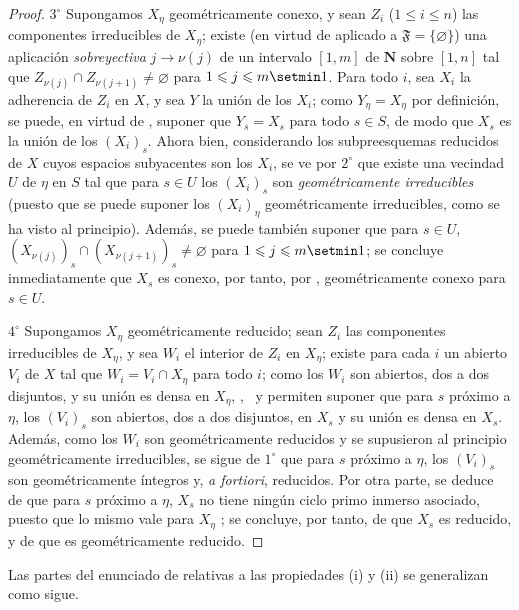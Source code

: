 \begin{proof}
$3^\circ$ Supongamos $X_\eta$ geométricamente conexo, y sean $Z_i$ ($1\leqslant i\leqslant n$) las componentes irreducibles de $X_\eta$; existe (en virtud de  aplicado a $\mathfrak F=\{\varnothing\}$) una aplicación \emph{sobreyectiva} $j\to\nu(j)$ de un intervalo $[1,m]$ de $\mathbf N$ sobre $[1,n]$ tal que $Z_{\nu(j)}\cap Z_{\nu(j+1)}\neq\varnothing$ para $1\leqslant j\leqslant m\setmin 1$.
Para todo $i$, sea $X_i$ la adherencia de $Z_i$ en $X$, y sea $Y$ la unión de los $X_i$; como $Y_\eta=X_\eta$ por definición, se puede, en virtud de , suponer que $Y_s=X_s$ para todo $s\in S$, de modo que $X_s$ es la unión de los $(X_i)_s$.
Ahora bien, considerando los subpreesquemas reducidos de $X$ cuyos espacios subyacentes son los $X_i$, se ve por $2^\circ$ que existe una vecindad $U$ de $\eta$ en $S$ tal que para $s\in U$ los $(X_i)_s$ son \emph{geométricamente irreducibles} (puesto que se puede suponer los $(X_i)_\eta$ geométricamente irreducibles, como se ha visto al principio).
Además, se puede también suponer que para $s\in U$, $(X_{\nu(j)})_s\cap(X_{\nu(j+1)})_s\neq\varnothing$  para $1\leqslant j\leqslant m\setmin 1$; se concluye inmediatamente que $X_s$ es conexo, por tanto, por , geométricamente conexo para $s\in U$.

$4^\circ$ Supongamos $X_\eta$ geométricamente reducido; sean $Z_i$ las componentes irreducibles de $X_\eta$, y sea $W_i$ el interior de $Z_i$ en $X_\eta$; existe para cada $i$ un abierto $V_i$ de $X$ tal que $W_i=V_i\cap X_\eta$ para todo $i$; como los $W_i$ son abiertos, dos a dos disjuntos, y su unión es densa en $X_\eta$, ,~ y  permiten suponer que para $s$ próximo a $\eta$, los $(V_i)_s$ son abiertos, dos a dos disjuntos, en $X_s$ y su unión es densa en $X_s$.
Además, como los $W_i$ son geométricamente reducidos y se supusieron al principio geométricamente irreducibles, se sigue de $1^\circ$ que para $s$ próximo a $\eta$, los $(V_i)_s$ son geométricamente íntegros y, \emph{a fortiori}, reducidos.
Por otra parte, se deduce de  que para $s$ próximo a $\eta$, $X_s$ no tiene ningún ciclo primo inmerso asociado, puesto que lo mismo vale para $X_\eta$ ; se concluye, por tanto, de  que $X_s$ es reducido, y de  que es geométricamente reducido.
\end{proof}


Las partes del enunciado de  relativas a las propiedades (i) y (ii) se generalizan como sigue.

